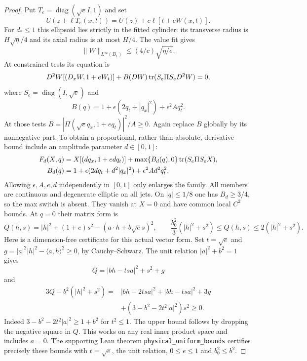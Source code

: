 \begin{proof}
Put $T_e=\operatorname{diag}(\sqrt e I,1)$ and set
\[
 U(z+\ell T_e(x,t))=U(z)+c\ell[t+eW(x,t)].
\]
For $d_*\leq1$ this ellipsoid lies strictly in the fitted cylinder:
its transverse radius is $H\sqrt\eta/4$ and its axial radius is at
most $H/4$. The value fit gives
\begin{equation}\label{eq:W-small}
 \|W\|_{L^\infty(B_1)}\leq(4/c)\sqrt{\eta/e}.
\end{equation}
At constrained tests its equation is
\[
 D^2W[(D_xW,1+eW_t)]+B(DW)\operatorname{tr}(S_e\Pi S_eD^2W)=0,
\]
where $S_e=\operatorname{diag}(I,\sqrt e)$ and
\[
 B(q)=1+\epsilon(2q_t+|q_x|^2)+\epsilon^2Aq_t^2.
\]
At those tests $B=|\Pi(\sqrt e q_x,1+e q_t)|^2/A\geq0$.
Again replace $B$ globally by its nonnegative part. To obtain a
proportional, rather than absolute, derivative bound include an
amplitude parameter $d\in[0,1]$:
\begin{align*}
 F_d(X,q)&=X[(d q_x,1+edq_t)]
           +\max\{B_d(q),0\}\operatorname{tr}(S_e\Pi S_eX),\\
 B_d(q)&=1+\epsilon(2dq_t+d^2|q_x|^2)
                          +\epsilon^2Ad^2q_t^2.
\end{align*}
Allowing $\epsilon,A,e,d$ independently in $[0,1]$ only enlarges
the family. All members are continuous and degenerate elliptic on
all jets. On $|q|\leq1/8$ one has $B_d\geq3/4$, so the max switch
is absent. They vanish at $X=0$ and have common local $C^2$ bounds.
At $q=0$ their matrix form is
\[
 Q(h,s)=|h|^2+(1+e)s^2-(a\cdot h+b\sqrt e s)^2,
 \qquad \frac{b_0^2}{3}(|h|^2+s^2)\leq Q(h,s)
                    \leq2(|h|^2+s^2).
\]
Here is a dimension-free certificate for this actual vector form.
Set $t=\sqrt e$ and
$g=|a|^2|h|^2-\langle a,h\rangle^2\geq0$, by Cauchy--Schwarz.
The unit relation $|a|^2+b^2=1$ gives
\[
 Q=|bh-tsa|^2+s^2+g
\]
and
\[
 \begin{split}
 3Q-b^2(|h|^2+s^2)
 ={}&|bh-2tsa|^2+|bh-tsa|^2+3g\\
    &+(3-b^2-2t^2|a|^2)s^2\geq0.
 \end{split}
\]
Indeed $3-b^2-2t^2|a|^2\geq1+b^2$ for $t^2\leq1$.
The upper bound follows by dropping the negative square in $Q$.
This works on any real inner product space and includes $a=0$.
The supporting Lean theorem \texttt{physical\_uniform\_bounds}
certifies precisely these bounds with $t=\sqrt e$, the unit relation,
$0\leq e\leq1$ and $b_0^2\leq b^2$.


\end{proof}
